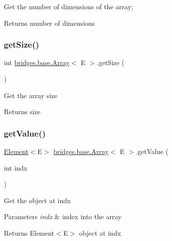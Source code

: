 Get the number of dimensions of the array;

\begin{DoxyReturn}{Returns}
number of dimensions 
\end{DoxyReturn}
\hypertarget{classbridges_1_1base_1_1_array_a49a3a4ea72c8315f1f14eed25071d18a}{}\label{classbridges_1_1base_1_1_array_a49a3a4ea72c8315f1f14eed25071d18a} 
\subsubsection{\texorpdfstring{get\+Size()}{getSize()}}
{\footnotesize\ttfamily int \hyperlink{classbridges_1_1base_1_1_array}{bridges.\+base.\+Array}$<$ E $>$.get\+Size (\begin{DoxyParamCaption}{ }\end{DoxyParamCaption})}

Get the array size

\begin{DoxyReturn}{Returns}
size 
\end{DoxyReturn}
\hypertarget{classbridges_1_1base_1_1_array_a40ba0fd6fb558c871e70691521e1c729}{}\label{classbridges_1_1base_1_1_array_a40ba0fd6fb558c871e70691521e1c729} 
\subsubsection{\texorpdfstring{get\+Value()}{getValue()}\hspace{0.1cm}{\footnotesize\ttfamily [1/3]}}
{\footnotesize\ttfamily \hyperlink{classbridges_1_1base_1_1_element}{Element}$<$E$>$ \hyperlink{classbridges_1_1base_1_1_array}{bridges.\+base.\+Array}$<$ E $>$.get\+Value (\begin{DoxyParamCaption}\item[{int}]{indx }\end{DoxyParamCaption})}

Get the object at \textquotesingle{}indx\textquotesingle{}


\begin{DoxyParams}{Parameters}
{\em indx} & index into the array \\
\hline
\end{DoxyParams}
\begin{DoxyReturn}{Returns}
Element$<$\+E$>$ object at \textquotesingle{}indx\textquotesingle{} 
\end{DoxyReturn}
\hypertarget{classbridges_1_1base_1_1_array_af777e1e68a1c91d22e4cb50db76e7bb6}{}\label{classbridges_1_1base_1_1_array_af777e1e68a1c91d22e4cb50db76e7bb6} 
